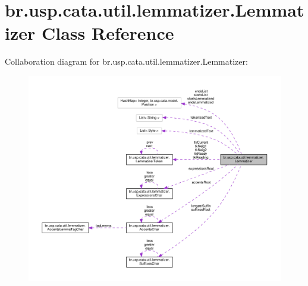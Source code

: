 \hypertarget{classbr_1_1usp_1_1cata_1_1util_1_1lemmatizer_1_1_lemmatizer}{\section{br.\+usp.\+cata.\+util.\+lemmatizer.\+Lemmatizer Class Reference}
\label{classbr_1_1usp_1_1cata_1_1util_1_1lemmatizer_1_1_lemmatizer}
}


Collaboration diagram for br.\+usp.\+cata.\+util.\+lemmatizer.\+Lemmatizer\+:\nopagebreak
\begin{figure}[H]
\begin{center}
\leavevmode
\includegraphics[width=350pt]{classbr_1_1usp_1_1cata_1_1util_1_1lemmatizer_1_1_lemmatizer__coll__graph}
\end{center}
\end{figure}

